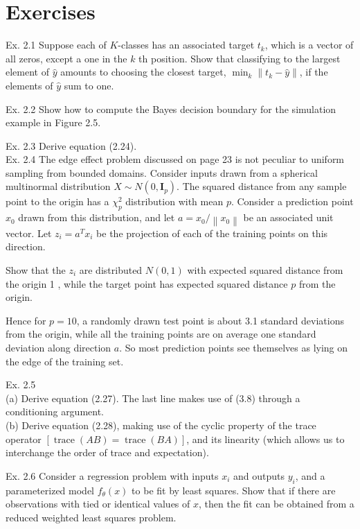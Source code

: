 \documentclass[10pt]{article}
\begin{document}
\section*{Exercises}
Ex. 2.1 Suppose each of $K$-classes has an associated target $t_{k}$, which is a vector of all zeros, except a one in the $k$ th position. Show that classifying to the largest element of $\hat{y}$ amounts to choosing the closest target, $\min _{k} \| t_{k}- \hat{y} \|$, if the elements of $\hat{y}$ sum to one.

Ex. 2.2 Show how to compute the Bayes decision boundary for the simulation example in Figure 2.5.

Ex. 2.3 Derive equation (2.24).\\
Ex. 2.4 The edge effect problem discussed on page 23 is not peculiar to uniform sampling from bounded domains. Consider inputs drawn from a spherical multinormal distribution $X \sim N\left(0, \mathbf{I}_{p}\right)$. The squared distance from any sample point to the origin has a $\chi_{p}^{2}$ distribution with mean $p$. Consider a prediction point $x_{0}$ drawn from this distribution, and let $a= x_{0} /\left\|x_{0}\right\|$ be an associated unit vector. Let $z_{i}=a^{T} x_{i}$ be the projection of each of the training points on this direction.

Show that the $z_{i}$ are distributed $N(0,1)$ with expected squared distance from the origin 1 , while the target point has expected squared distance $p$ from the origin.

Hence for $p=10$, a randomly drawn test point is about 3.1 standard deviations from the origin, while all the training points are on average one standard deviation along direction $a$. So most prediction points see themselves as lying on the edge of the training set.

Ex. 2.5\\
(a) Derive equation (2.27). The last line makes use of (3.8) through a conditioning argument.\\
(b) Derive equation (2.28), making use of the cyclic property of the trace operator $[\operatorname{trace}(A B)=\operatorname{trace}(B A)]$, and its linearity (which allows us to interchange the order of trace and expectation).

Ex. 2.6 Consider a regression problem with inputs $x_{i}$ and outputs $y_{i}$, and a parameterized model $f_{\theta}(x)$ to be fit by least squares. Show that if there are observations with tied or identical values of $x$, then the fit can be obtained from a reduced weighted least squares problem.
\end{document}
